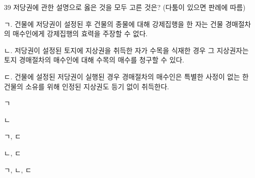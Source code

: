 \begin{question}{39}
저당권에 관한 설명으로 옳은 것을 모두 고른 것은? (다툼이 있으면 판례에 따름)
\begin{framedtext}
ㄱ. 건물에 저당권이 설정된 후 건물의 종물에 대해 강제집행을 한 자는 건물 경매절차의 매수인에게 강제집행의 효력을 주장할 수 없다. \par
ㄴ. 저당권이 설정된 토지에 지상권을 취득한 자가 수목을 식재한 경우 그 지상권자는 토지 경매절차의 매수인에 대해 수목의 매수를 청구할 수 있다. \par
ㄷ. 건물에 설정된 저당권이 실행된 경우 경매절차의 매수인은 특별한 사정이 없는 한 건물의 소유를 위해 인정된 지상권도 등기 없이 취득한다.
\end{framedtext}
\begin{choices}
  \item ㄱ
  \item ㄴ
  \item ㄱ, ㄷ
  \item ㄴ, ㄷ
  \item ㄱ, ㄴ, ㄷ
\end{choices}
\end{question}
